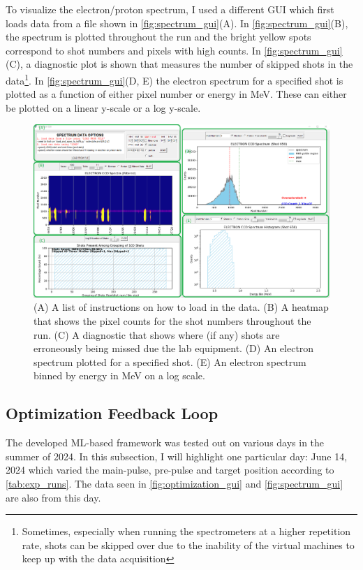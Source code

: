 To visualize the electron/proton spectrum, I used a different \gls{GUI} which first loads data from a file shown in \autoref{fig:spectrum_gui}(A). In \autoref{fig:spectrum_gui}(B), the spectrum is plotted throughout the run and the bright yellow spots correspond to shot numbers and pixels with high counts. In \autoref{fig:spectrum_gui}(C), a diagnostic plot is shown that measures the number of skipped shots in the data\footnote{Sometimes, especially when running the spectrometers at a higher repetition rate, shots can be skipped over due to the inability of the virtual machines to keep up with the data acquisition}. In \autoref{fig:spectrum_gui}(D, E) the electron spectrum for a specified shot is plotted as a function of either pixel number or energy in MeV. These can either be plotted on a linear y-scale or a log y-scale.

\begin{figure}
	\centering 
	\includegraphics[width=\linewidth]{planning/images/daq/spectrum_gui.png}
	\caption{(A) A list of instructions on how to load in the data. (B) A heatmap that shows the pixel counts for the shot numbers throughout the run. (C) A diagnostic that shows where (if any) shots are erroneously being missed due the lab equipment. (D) An electron spectrum plotted for a specified shot. (E) An electron spectrum binned by energy in MeV on a log scale.}
	\label{fig:spectrum_gui}
\end{figure}

\subsection{Optimization Feedback Loop}
The developed \gls{ML}-based framework was tested out on various days in the summer of 2024. In this subsection, I will highlight one particular day: June 14, 2024 which varied the main-pulse, pre-pulse and target position according to \autoref{tab:exp_runs}. The data seen in \autoref{fig:optimization_gui} and \autoref{fig:spectrum_gui} are also from this day. 


